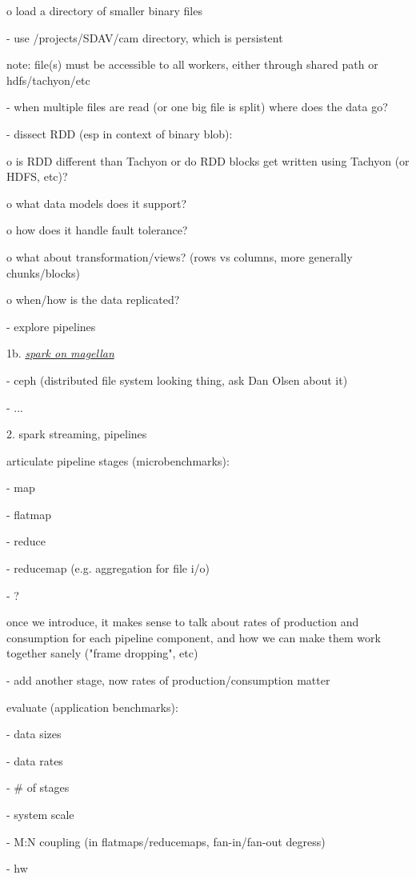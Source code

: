 \documentclass{sig-alternate}
\begin{document}
o load a directory of smaller binary files

- use /projects/SDAV/cam directory, which is persistent

note: file(s) must be accessible to all workers, either through shared
path or hdfs/tachyon/etc

- when multiple files are read (or one big file is split) where does the
data go?

- dissect RDD (esp in context of binary blob):

o is RDD different than Tachyon or do RDD blocks get written using
Tachyon (or HDFS, etc)?

o what data models does it support?

o how does it handle fault tolerance?

o what about transformation/views? (rows vs columns, more generally
chunks/blocks)

o when/how is the data replicated?

- explore pipelines

1b.
\href{https://docs.google.com/document/d/1lyzEHap1EznES0DKiMa3fsalepqPD6vnbZqSEMjCVPQ/edit?usp=sharing}{\emph{spark
on magellan}}

- ceph (distributed file system looking thing, ask Dan Olsen about it)

- ...

2. spark streaming, pipelines

articulate pipeline stages (microbenchmarks):

- map

- flatmap

- reduce

- reducemap (e.g. aggregation for file i/o)

- ?

once we introduce, it makes sense to talk about rates of production and
consumption for each pipeline component, and how we can make them work
together sanely ("frame dropping", etc)

- add another stage, now rates of production/consumption matter

evaluate (application benchmarks):

- data sizes

- data rates

- \# of stages

- system scale

- M:N coupling (in flatmaps/reducemaps, fan-in/fan-out degress)

- hw
\end{document}
